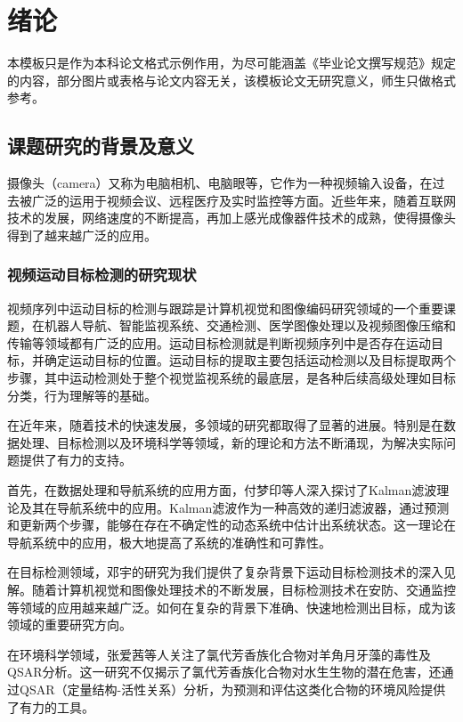 
\section{绪论}

本模板只是作为本科论文格式示例作用，为尽可能涵盖《毕业论文撰写规范》规定的内容，部分图片或表格与论文内容无关，该模板论文无研究意义，师生只做格式参考。

\subsection{课题研究的背景及意义}

摄像头（camera）又称为电脑相机、电脑眼等，它作为一种视频输入设备，在过去被广泛的运用于视频会议、远程医疗及实时监控等方面。近些年来，随着互联网技术的发展，网络速度的不断提高，再加上感光成像器件技术的成熟，使得摄像头得到了越来越广泛的应用。

\subsubsection{视频运动目标检测的研究现状}

视频序列中运动目标的检测与跟踪是计算机视觉和图像编码研究领域的一个重要课题，在机器人导航、智能监视系统、交通检测、医学图像处理以及视频图像压缩和传输等领域都有广泛的应用。运动目标检测就是判断视频序列中是否存在运动目标，并确定运动目标的位置。运动目标的提取主要包括运动检测以及目标提取两个步骤，其中运动检测处于整个视觉监视系统的最底层，是各种后续高级处理如目标分类，行为理解等的基础。

在近年来，随着技术的快速发展，多领域的研究都取得了显著的进展。特别是在数据处理、目标检测以及环境科学等领域，新的理论和方法不断涌现，为解决实际问题提供了有力的支持。

首先，在数据处理和导航系统的应用方面，付梦印等人深入探讨了Kalman滤波理论及其在导航系统中的应用\cite{付梦印2003}。Kalman滤波作为一种高效的递归滤波器，通过预测和更新两个步骤，能够在存在不确定性的动态系统中估计出系统状态。这一理论在导航系统中的应用，极大地提高了系统的准确性和可靠性。

在目标检测领域，邓宇的研究为我们提供了复杂背景下运动目标检测技术的深入见解\cite{邓宇2007}。随着计算机视觉和图像处理技术的不断发展，目标检测技术在安防、交通监控等领域的应用越来越广泛。如何在复杂的背景下准确、快速地检测出目标，成为该领域的重要研究方向。

在环境科学领域，张爱茜等人关注了氯代芳香族化合物对羊角月牙藻的毒性及QSAR分析\cite{张爱茜2000}。这一研究不仅揭示了氯代芳香族化合物对水生生物的潜在危害，还通过QSAR（定量结构-活性关系）分析，为预测和评估这类化合物的环境风险提供了有力的工具。

